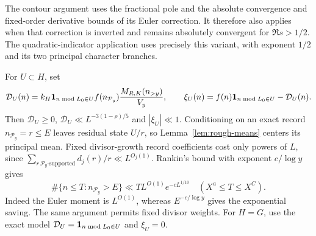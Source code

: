 The contour argument uses the fractional pole and the absolute
convergence and fixed-order derivative bounds of its Euler correction.
It therefore also applies when that correction is inverted and remains
absolutely convergent for \(\Re s>1/2\). The quadratic-indicator
application uses precisely this variant, with exponent \(1/2\)
and its two principal character branches.

For \(U\subset H\), set
\begin{equation}\label{eq:corrected-model}
 \mathcal D_U(n)=k_H\mathbf 1_{n\bmod L_0\in U}f(n_{\mathcal P_y})
                       \frac{M_{R,K}(n_{>y})}{V_y},\qquad
 \xi_U(n)=f(n)\mathbf 1_{n\bmod L_0\in U}-\mathcal D_U(n).
\end{equation}
Then \(\mathcal D_U\ge0\), \(\mathcal D_U\ll L^{-3(1-\rho)/5}\) and
\(|\xi_U|\ll1\). Conditioning on an exact record \(n_{\mathcal P_y}=r\le E\)
leaves residual state \(U/r\), so Lemma~\ref{lem:rough-means}
centers its principal mean. Fixed divisor-growth record coefficients
cost only powers of \(L\), since
\(\sum_{r\ \mathcal P_y\text{-supported}}d_j(r)/r\ll L^{O_j(1)}\).
Rankin's bound with exponent \(c/\log y\) gives
\begin{equation}\label{eq:record-tail}
\#\{n\le T:n_{\mathcal P_y}>E\}\ll TL^{O(1)}e^{-cL^{1/10}}
 \quad(X^a\le T\le X^C).
\end{equation}
Indeed the Euler moment is \(L^{O(1)}\), whereas
\(E^{-c/\log y}\) gives the exponential saving. The same argument
permits fixed divisor weights. For \(H=G\), use the exact model
\(\mathcal D_U=\mathbf 1_{n\bmod L_0\in U}\) and \(\xi_U=0\).

